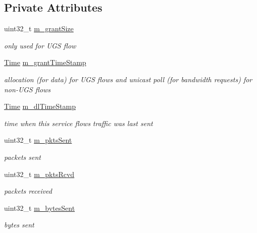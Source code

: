 \subsection*{Private Attributes}
\begin{DoxyCompactItemize}
\item 
uint32\+\_\+t \hyperlink{classns3_1_1ServiceFlowRecord_af379f43146c682788c4c23a663d90ead}{m\+\_\+grant\+Size}
\begin{DoxyCompactList}\small\item\em only used for U\+GS flow \end{DoxyCompactList}\item 
\hyperlink{classns3_1_1Time}{Time} \hyperlink{classns3_1_1ServiceFlowRecord_aec2428d524d99ea52ed414bfb18f3a3c}{m\+\_\+grant\+Time\+Stamp}
\begin{DoxyCompactList}\small\item\em allocation (for data) for U\+GS flows and unicast poll (for bandwidth requests) for non-\/\+U\+GS flows \end{DoxyCompactList}\item 
\hyperlink{classns3_1_1Time}{Time} \hyperlink{classns3_1_1ServiceFlowRecord_ad03ab2517099cb53abe26ffeb77f08fa}{m\+\_\+dl\+Time\+Stamp}
\begin{DoxyCompactList}\small\item\em time when this service flow\textquotesingle{}s traffic was last sent \end{DoxyCompactList}\item 
uint32\+\_\+t \hyperlink{classns3_1_1ServiceFlowRecord_a86e6eff06ec00a33783383e5d1543e93}{m\+\_\+pkts\+Sent}
\begin{DoxyCompactList}\small\item\em packets sent \end{DoxyCompactList}\item 
uint32\+\_\+t \hyperlink{classns3_1_1ServiceFlowRecord_a4e7b57f4204b86b1a2909c6e4e36806e}{m\+\_\+pkts\+Rcvd}
\begin{DoxyCompactList}\small\item\em packets received \end{DoxyCompactList}\item 
uint32\+\_\+t \hyperlink{classns3_1_1ServiceFlowRecord_acb16674f34ed488f1f03bb5138ec3bfd}{m\+\_\+bytes\+Sent}
\begin{DoxyCompactList}\small\item\em bytes sent \end{DoxyCompactList}\item 

\end{DoxyCompactItemize}
